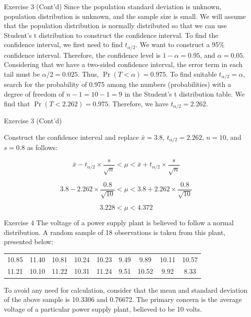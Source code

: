 \documentclass[
  ignorenonframetext,
  aspectratio=43,
]{beamer}
\begin{document}
\begin{frame}{Exercise 3 (Cont'd)}
\protect\hypertarget{exercise-3-contd}{}
Since the population standard deviation is unknown, population
distribution is unknown, and the sample size is small. We will assume
that the population distribution is normally distributed so that we can
use Student's t distribution to construct the confidence interval. To
find the confidence interval, we first need to find \(t_{\alpha/2}\). We
want to construct a 95\% confidence interval. Therefore, the confidence
level is \(1-\alpha = 0.95\), and \(\alpha = 0.05\). Considering that we
have a two-sided confidence interval, the error term in each tail must
be \(\alpha/2 = 0.025\). Thus, \(\Pr(T < \alpha) = 0.975\). To find
suitable \(t_{\alpha/2} = \alpha\), search for the probability of 0.975
among the numbers (probabilities) with a degree of freedom of
\(n-1 = 10-1 = 9\) in the Student's t distribution table. We find that
\(\Pr(T < 2.262) = 0.975\). Therefore, we have \(t_{\alpha/2} = 2.262\).
\end{frame}

\begin{frame}{Exercise 3 (Cont'd)}
\protect\hypertarget{exercise-3-contd-1}{}
\pause

Construct the confidence interval and replace \(\bar{x} = 3.8\),
\(t_{\alpha/2} = 2.262\), \(n = 10\), and \(s = 0.8\) as follows:

\pause

\[
\bar{x} - t_{\alpha/2} \times \frac{s}{\sqrt{n}} < \mu < \bar{x} + t_{\alpha/2} \times \frac{s}{\sqrt{n}}
\]

\pause

\[
3.8 - 2.262 \times \frac{0.8}{\sqrt{10}} < \mu < 3.8 + 2.262 \times \frac{0.8}{\sqrt{10}}
\]

\pause

\[
3.228 < \mu < 4.372
\]
\end{frame}

\begin{frame}{Exercise 4}
\protect\hypertarget{exercise-4}{}
The voltage of a power supply plant is believed to follow a normal
distribution. A random sample of 18 observations is taken from this
plant, presented below:

\bigskip
\begin{table}[h!]
\footnotesize
\centering
\begin{tabular}{ccccccccc}
\toprule
10.85 & 11.40 & 10.81 & 10.24 & 10.23 & 9.49 & 9.89 & 10.11 & 10.57 \\
11.21 & 10.10 & 11.22 & 10.31 & 11.24 & 9.51 & 10.52 & 9.92 & 8.33  \\
\bottomrule
\end{tabular}
\end{table}
\medskip

To avoid any need for calculation, consider that the mean and standard
deviation of the above sample is 10.3306 and 0.76672. The primary
concern is the average voltage of a particular power supply plant,
believed to be 10 volts.
\end{frame}
\end{document}
